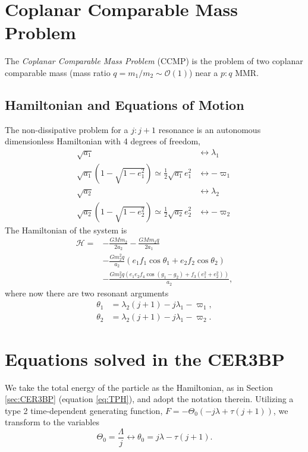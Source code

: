 \documentclass[usenatbib,twocolumn]{mnras}
\begin{document}
\section{Coplanar Comparable Mass Problem}
The \emph{Coplanar Comparable Mass Problem} (CCMP) is the problem of two coplanar comparable mass (mass ratio $q=m_1/m_2\sim\mathcal O(1)$) near a $p:q$ MMR.

\subsection{Hamiltonian and Equations of Motion}
The non-dissipative problem for a $j:j+1$ resonance is an autonomous dimensionless Hamiltonian with 4 degrees of freedom,
\begin{align}
    \sqrt{a_1}&\leftrightarrow \lambda_1\\
    \sqrt{a_1}(1-\sqrt{1-e_1^2})\simeq\frac12\sqrt{a_1}e_1^2&\leftrightarrow -\varpi_1\\
    \sqrt{a_2}&\leftrightarrow \lambda_2\\
    \sqrt{a_2}(1-\sqrt{1-e_2^2})\simeq\frac12\sqrt{a_2}e_2^2&\leftrightarrow -\varpi_2
\end{align}
The Hamiltonian of the system is
\begin{align}
    \mathcal H=
    &- \frac{G M m_{2}}{2 a_{2}} - \frac{G M m_{2} q}{2 a_{1}} \\
    &- \frac{G m_{2}^{2} q}{a_{2}} \left(e_{1} f_{1} \cos{\theta_1} + e_{2} f_{2} \cos{\theta_2}\right) \\
    &- \frac{G m_{2}^{2} q \left(e_{1} e_{2} f_{4} \cos{\left(g_{1} - g_{2} \right)} + f_{3} \left(e_{1}^{2} + e_{2}^{2}\right)\right)}{a_{2}},
\end{align}
where now there are two resonant arguments
\begin{align}
    \theta_1 &=\lambda_{2} \left(j + 1\right) - j \lambda_{1}-\varpi_{1}, \\
    \theta_2 &= \lambda_{2} \left(j + 1\right)- j \lambda_{1}-\varpi_{2}.
\end{align}





\clearpage


\clearpage
\onecolumn
\appendix
\section{Equations solved in the CER3BP}
We take the total energy of the particle as the Hamiltonian, as in Section \ref{sec:CER3BP} (equation \ref{eq:TPH}), and adopt the notation therein.
Utilizing a type 2 time-dependent generating function, $F=- \Theta_{0} \left(- j \lambda + \tau \left(j + 1\right)\right)$, we transform to the variables
\begin{equation}
    \Theta_{0} = \frac{\Lambda}{j} \longleftrightarrow
    \theta_0 = j \lambda - \tau \left(j + 1\right).
\end{equation}
\end{document}
